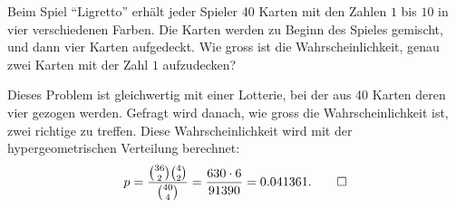Beim Spiel ``Ligretto'' erhält jeder Spieler 40 Karten mit den
Zahlen $1$ bis $10$ in vier verschiedenen Farben. Die Karten werden
zu Beginn des Spieles gemischt, und dann vier Karten aufgedeckt.
Wie gross ist die Wahrscheinlichkeit, genau zwei Karten mit der
Zahl $1$ aufzudecken?

\begin{loesung}
Dieses Problem ist gleichwertig mit einer Lotterie, bei der
aus 40 Karten deren vier gezogen werden. Gefragt wird danach,
wie gross die Wahrscheinlichkeit ist, zwei richtige zu treffen.
Diese Wahrscheinlichkeit wird mit der hypergeometrischen Verteilung
berechnet:
\[
p=\frac{\binom{36}{2}\binom{4}{2}}{\binom{40}{4}}
=\frac{630\cdot 6}{91390}=0.041361.
\qedhere
\]
\end{loesung}

